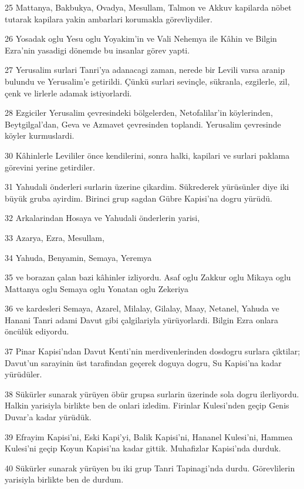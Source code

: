\par 25 Mattanya, Bakbukya, Ovadya, Mesullam, Talmon ve Akkuv kapilarda nöbet tutarak kapilara yakin ambarlari korumakla görevliydiler.
\par 26 Yosadak oglu Yesu oglu Yoyakim'in ve Vali Nehemya ile Kâhin ve Bilgin Ezra'nin yasadigi dönemde bu insanlar görev yapti.
\par 27 Yerusalim surlari Tanri'ya adanacagi zaman, nerede bir Levili varsa aranip bulundu ve Yerusalim'e getirildi. Çünkü surlari sevinçle, sükranla, ezgilerle, zil, çenk ve lirlerle adamak istiyorlardi.
\par 28 Ezgiciler Yerusalim çevresindeki bölgelerden, Netofalilar'in köylerinden, Beytgilgal'dan, Geva ve Azmavet çevresinden toplandi. Yerusalim çevresinde köyler kurmuslardi.
\par 30 Kâhinlerle Levililer önce kendilerini, sonra halki, kapilari ve surlari paklama görevini yerine getirdiler.
\par 31 Yahudali önderleri surlarin üzerine çikardim. Sükrederek yürüsünler diye iki büyük gruba ayirdim. Birinci grup sagdan Gübre Kapisi'na dogru yürüdü.
\par 32 Arkalarindan Hosaya ve Yahudali önderlerin yarisi,
\par 33 Azarya, Ezra, Mesullam,
\par 34 Yahuda, Benyamin, Semaya, Yeremya
\par 35 ve borazan çalan bazi kâhinler izliyordu. Asaf oglu Zakkur oglu Mikaya oglu Mattanya oglu Semaya oglu Yonatan oglu Zekeriya
\par 36 ve kardesleri Semaya, Azarel, Milalay, Gilalay, Maay, Netanel, Yahuda ve Hanani Tanri adami Davut gibi çalgilariyla yürüyorlardi. Bilgin Ezra onlara öncülük ediyordu.
\par 37 Pinar Kapisi'ndan Davut Kenti'nin merdivenlerinden dosdogru surlara çiktilar; Davut'un sarayinin üst tarafindan geçerek doguya dogru, Su Kapisi'na kadar yürüdüler.
\par 38 Sükürler sunarak yürüyen öbür grupsa surlarin üzerinde sola dogru ilerliyordu. Halkin yarisiyla birlikte ben de onlari izledim. Firinlar Kulesi'nden geçip Genis Duvar'a kadar yürüdük.
\par 39 Efrayim Kapisi'ni, Eski Kapi'yi, Balik Kapisi'ni, Hananel Kulesi'ni, Hammea Kulesi'ni geçip Koyun Kapisi'na kadar gittik. Muhafizlar Kapisi'nda durduk.
\par 40 Sükürler sunarak yürüyen bu iki grup Tanri Tapinagi'nda durdu. Görevlilerin yarisiyla birlikte ben de durdum.
